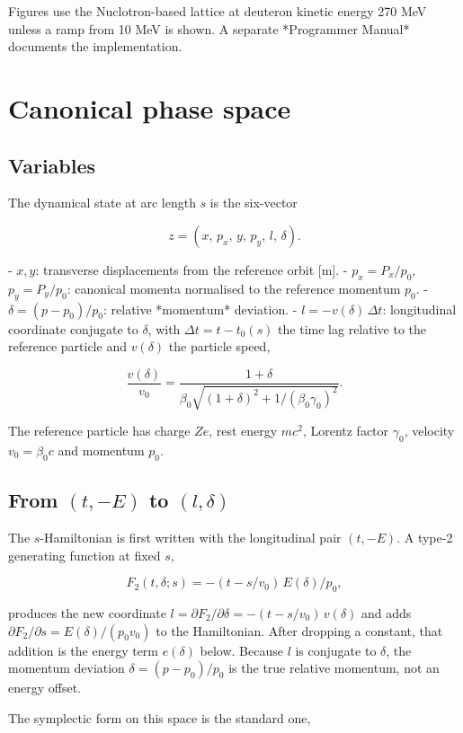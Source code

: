 \documentclass[11pt,a4paper]{article}
\begin{document}
Figures use the Nuclotron-based lattice at deuteron kinetic energy 270 MeV
unless a ramp from 10 MeV is shown. A separate *Programmer Manual* documents
the implementation.

\clearpage
\section{Canonical phase space}

\subsection{Variables}

The dynamical state at arc length $s$ is the six-vector

\[
z=(x,\,p_x,\,y,\,p_y,\,l,\,\delta).
\]

- $x,y$: transverse displacements from the reference orbit [m].
- $p_x=P_x/p_0$, $p_y=P_y/p_0$: canonical momenta normalised to the
  reference momentum $p_0$.
- $\delta=(p-p_0)/p_0$: relative *momentum* deviation.
- $l=-v(\delta)\,\Delta t$: longitudinal coordinate conjugate to $\delta$,
  with $\Delta t=t-t_0(s)$ the time lag relative to the reference particle
  and $v(\delta)$ the particle speed,

\[
\frac{v(\delta)}{v_0}=\frac{1+\delta}{\beta_0\sqrt{(1+\delta)^2+1/(\beta_0\gamma_0)^2}}.
\]

The reference particle has charge $Ze$, rest energy $mc^2$, Lorentz factor
$\gamma_0$, velocity $v_0=\beta_0 c$ and momentum $p_0$.

\subsection{From $(t,-E)$ to $(l,\delta)$}

The $s$-Hamiltonian is first written with the longitudinal pair
$(t,-E)$. A type-2 generating function at fixed $s$,

\[
F_2(t,\delta;s)=-(t-s/v_0)\,E(\delta)/p_0,
\]

produces the new coordinate $l=\partial F_2/\partial\delta=-(t-s/v_0)\,v(\delta)$
and adds $\partial F_2/\partial s=E(\delta)/(p_0 v_0)$ to the Hamiltonian.
After dropping a constant, that addition is the energy term $e(\delta)$
below. Because $l$ is conjugate to $\delta$, the momentum deviation
$\delta=(p-p_0)/p_0$ is the true relative momentum, not an energy offset.

The symplectic form on this space is the standard one,
\end{document}
